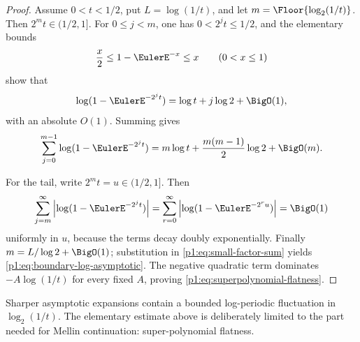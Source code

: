 \documentclass[11pt,oneside]{article}
\numberwithin{equation}{section}
\theoremstyle{definition}
\theoremstyle{remark}
\begin{document}
\begin{proof}
Assume \(0<t<1/2\), put \(L=\log(1/t)\), and let
\(m=\Floor{\log_2(1/t)}\).  Then
\(2^mt\in(1/2,1]\).  For \(0\le j<m\), one has \(0<2^jt\le1/2\), and the
elementary bounds
\begin{equation}
  \frac{x}{2}\le1-\EulerE^{-x}\le x
  \qquad(0<x\le1)
  \label{p1:eq:one-minus-exp-bounds}
\end{equation}
show that
\begin{equation}
  \log(1-\EulerE^{-2^jt})=\log t+j\log2+\BigO(1),
  \label{p1:eq:small-factor-log}
\end{equation}
with an absolute \(O(1)\).  Summing gives
\begin{equation}
 \sum_{j=0}^{m-1}\log(1-\EulerE^{-2^jt})
 =m\log t+\frac{m(m-1)}2\log2+\BigO(m).
 \label{p1:eq:small-factor-sum}
\end{equation}

For the tail, write \(2^mt=u\in(1/2,1]\).  Then
\begin{equation}
 \sum_{j=m}^{\infty}\left|\log(1-\EulerE^{-2^jt})\right|
 =\sum_{r=0}^{\infty}\left|\log(1-\EulerE^{-2^ru})\right|=\BigO(1)
 \label{p1:eq:tail-uniform}
\end{equation}
uniformly in \(u\), because the terms decay doubly exponentially.  Finally
\(m=L/\log2+\BigO(1)\); substitution in
\eqref{p1:eq:small-factor-sum} yields
\eqref{p1:eq:boundary-log-asymptotic}.  The negative quadratic term dominates
\(-A\log(1/t)\) for every fixed \(A\), proving
\eqref{p1:eq:superpolynomial-flatness}.
\end{proof}

\begin{remark}
Sharper asymptotic expansions contain a bounded log-periodic fluctuation in
\(\log_2(1/t)\).  The elementary estimate above is deliberately limited to the
part needed for Mellin continuation: super-polynomial flatness.
\end{remark}
\end{document}
